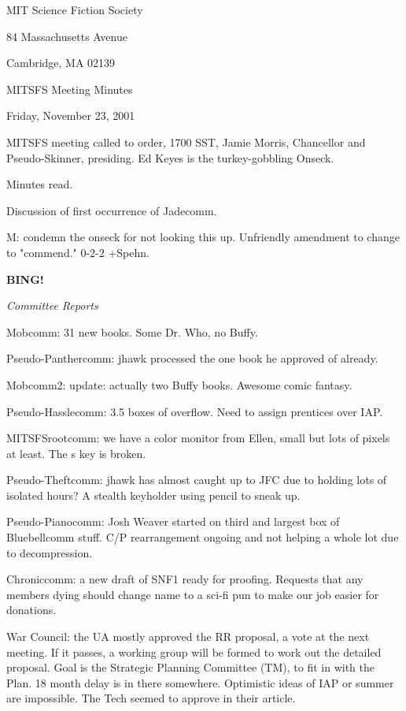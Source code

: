 \documentclass[12pt]{article}
\newcommand{\bing}{{\bf BING!} }
\newcommand{\goto}[1]{\bing \vskip 12pt \centerline{{\em{#1}}}}
\begin{document}
\begin{center}

MIT Science Fiction Society 

84 Massachusetts Avenue

Cambridge, MA 02139

\vspace{12pt}

MITSFS Meeting Minutes 

Friday, November 23, 2001

\end{center}
 
\vspace{18pt}

\setlength{\parskip}{6pt}

\noindent
MITSFS meeting called to order, 1700 SST, Jamie Morris, Chancellor and Pseudo-Skinner, presiding.  Ed Keyes is the turkey-gobbling Onseck.

Minutes read.

Discussion of first occurrence of Jadecomm.

M: condemn the onseck for not looking this up. Unfriendly amendment to change to "commend." 0-2-2 +Spehn.

\goto{Committee Reports}

Mobcomm: 31 new books. Some Dr. Who, no Buffy.

Pseudo-Panthercomm: jhawk processed the one book he approved of already.

Mobcomm2: update: actually two Buffy books. Awesome comic fantasy.

Pseudo-Hasslecomm: 3.5 boxes of overflow. Need to assign prentices over IAP.

MITSFSrootcomm: we have a color monitor from Ellen, small but lots of pixels at least. The s key is broken.

Pseudo-Theftcomm: jhawk has almost caught up to JFC due to holding lots of isolated hours? A stealth keyholder using pencil to sneak up.

Pseudo-Pianocomm: Josh Weaver started on third and largest box of Bluebellcomm stuff. C/P rearrangement ongoing and not helping a whole lot due to decompression.

Chroniccomm: a new draft of SNF1 ready for proofing. Requests that any members dying should change name to a sci-fi pun to make our job easier for donations.

War Council: the UA mostly approved the RR proposal, a vote at the next meeting. If it passes, a working group will be formed to work out the detailed proposal. Goal is the Strategic Planning Committee (TM), to fit in with the Plan. 18 month delay is in there somewhere. Optimistic ideas of IAP or summer are impossible. The Tech seemed to approve in their article.
\end{document}

